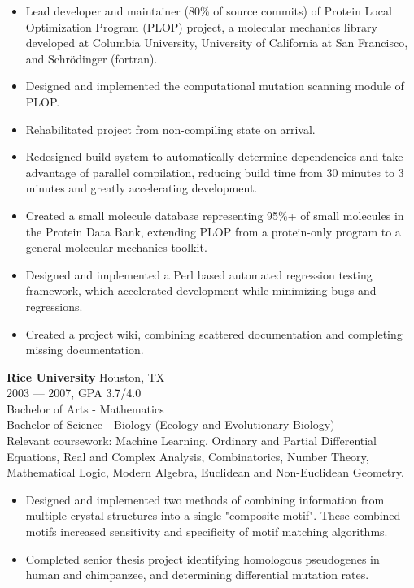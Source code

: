 \begin{itemize}[topsep=1ex, partopsep=0ex, parsep=0ex, itemsep=0.5ex]
    \item Lead developer and maintainer ({\mytilde}80\% of source commits) of Protein Local Optimization Program (PLOP) project, a molecular mechanics library developed at Columbia University, University of California at San Francisco, and Schr\"{o}dinger (fortran).
    \item Designed and implemented the computational mutation scanning module of PLOP.
    \item Rehabilitated project from non-compiling state on arrival.
    \item Redesigned build system to automatically determine dependencies and take advantage of parallel compilation, reducing build time from {\mytilde}30 minutes to {\mytilde}3 minutes and greatly accelerating development.
    \item Created a small molecule database representing 95\%+ of small molecules in the Protein Data Bank, extending PLOP from a protein-only program to a general molecular mechanics toolkit.
    \item Designed and implemented a Perl based automated regression testing framework, which accelerated development while minimizing bugs and regressions.
    \item Created a project wiki, combining scattered documentation and completing missing documentation.
\end{itemize}

\vspace{\littleskip}



\myfontsize{\bigheader}
\textbf{Rice University}
\myfontsize{\bodysize}
Houston, TX\\
2003 --- 2007, GPA 3.7/4.0\\
Bachelor of Arts - Mathematics\\
Bachelor of Science - Biology (Ecology and Evolutionary Biology)\\
Relevant coursework: Machine Learning, Ordinary and Partial Differential Equations, Real and Complex Analysis, Combinatorics, Number Theory, Mathematical Logic, Modern Algebra, Euclidean and Non-Euclidean Geometry.
\begin{itemize}[topsep=1ex, partopsep=0ex, parsep=0ex, itemsep=0.5ex]
    \item Designed and implemented two methods of combining information from multiple crystal structures into a single "composite motif". These combined motifs increased sensitivity and specificity of motif matching algorithms.
    \item Completed senior thesis project identifying homologous pseudogenes in human and chimpanzee, and determining differential mutation rates.
\end{itemize}

